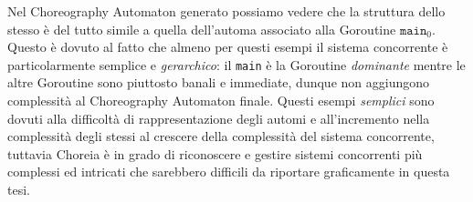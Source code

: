 Nel Choreography Automaton generato possiamo vedere che la struttura dello stesso è del tutto simile a quella dell'automa associato alla Goroutine $\texttt{main}_0$. Questo è dovuto al fatto che almeno per questi esempi il sistema concorrente è particolarmente semplice e \emph{gerarchico}: il \texttt{main} è la Goroutine \emph{dominante} mentre le altre Goroutine sono piuttosto banali e immediate, dunque non aggiungono complessità al Choreography Automaton finale. Questi esempi \emph{semplici} sono dovuti alla difficoltà di rappresentazione degli automi e all'incremento nella complessità degli stessi al crescere della complessità del sistema concorrente, tuttavia Choreia è in grado di riconoscere e gestire sistemi concorrenti più complessi ed intricati che sarebbero difficili da riportare graficamente in questa tesi.
\begin{figure}[h!]
    \centering
\end{figure}


